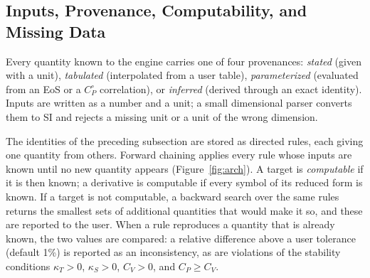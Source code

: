 \documentclass[journal=iecred,manuscript=article,layout=twocolumn]{achemso}
\newcommand{\Cpo}{C_P^{\circ}}
\begin{document}
\subsection{Inputs, Provenance, Computability, and Missing Data}

Every quantity known to the engine carries one of four provenances:
\emph{stated} (given with a unit), \emph{tabulated} (interpolated from a user
table), \emph{parameterized} (evaluated from an EoS or a $\Cpo$ correlation), or
\emph{inferred} (derived through an exact identity). Inputs are written as a
number and a unit; a small dimensional parser converts them to SI and rejects a
missing unit or a unit of the wrong dimension.

The identities of the preceding subsection are stored as directed rules, each
giving one quantity from others. Forward chaining applies every rule whose
inputs are known until no new quantity appears (Figure~\ref{fig:arch}). A target
is \emph{computable} if it is then known; a derivative is computable if every
symbol of its reduced form is known. If a target is not computable, a backward
search over the same rules returns the smallest sets of additional quantities
that would make it so, and these are reported to the user. When a rule
reproduces a quantity that is already known, the two values are compared: a
relative difference above a user tolerance (default 1\%) is reported as an
inconsistency, as are violations of the stability conditions $\kappa_T > 0$,
$\kappa_S > 0$, $C_V > 0$, and $C_P \ge C_V$.
\end{document}
